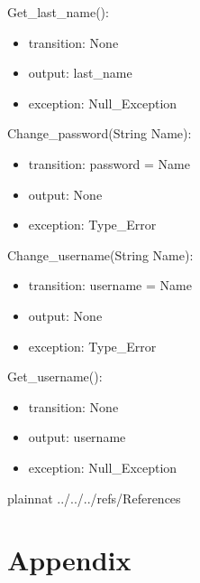 \documentclass[12pt, titlepage]{article}
\begin{document}
\noindent Get\_last\_name():
\begin{itemize}
\item transition: None
\item output: last\_name
\item exception: Null\_Exception 
\end{itemize}


\noindent Change\_password(String Name):
\begin{itemize}
\item transition: password = Name
\item output: None
\item exception: Type\_Error 
\end{itemize}

\noindent Change\_username(String Name):
\begin{itemize}
\item transition: username = Name
\item output: None
\item exception: Type\_Error 
\end{itemize}

\noindent Get\_username():
\begin{itemize}
\item transition: None
\item output: username
\item exception: Null\_Exception 
\end{itemize}

\newpage




 {plainnat}
 {../../../refs/References}

\section{Appendix} \label{Appendix}
\end{document}
